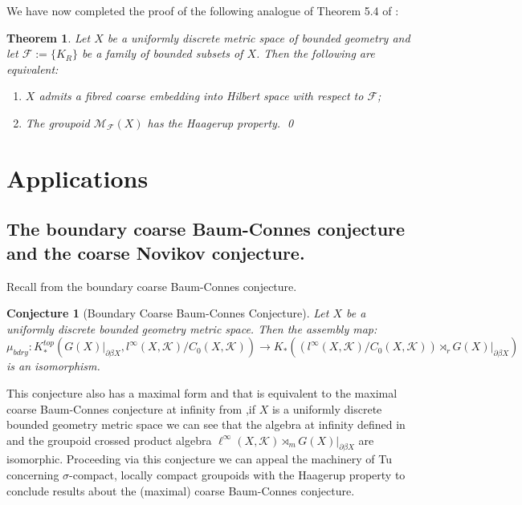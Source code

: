 \documentclass[11pt]{amsart}
\theoremstyle{plain}
\newtheorem{theorem}{Theorem}%
\newtheorem*{conjecture1}{Conjecture}
\theoremstyle{definition}%
\theoremstyle{remark}%
\begin{document}
{We have now completed the proof of the following analogue of Theorem 5.4 of \cite{MR1905840}:

\begin{theorem}
Let $X$ be a uniformly discrete metric space of bounded geometry and let $\mathcal{F}:=\lbrace K_{R} \rbrace$ be a family of bounded subsets of $X$. Then the following are equivalent:
\begin{enumerate}
\item $X$ admits a fibred coarse embedding into Hilbert space with respect to $\mathcal{F}$;
\item The groupoid $\mathcal{M}_{\mathcal{F}}(X)$ has the Haagerup property. \qed
\end{enumerate}
\end{theorem}

\section{Applications}\label{sect:apps}

\subsection{The boundary coarse Baum-Connes conjecture and the coarse Novikov conjecture.}\label{Sect:apps}
Recall from \cite{mypub1} the boundary coarse Baum-Connes conjecture.
\begin{conjecture1} [Boundary Coarse Baum-Connes Conjecture]
Let $X$ be a uniformly discrete bounded geometry metric space. Then the assembly map:
\begin{equation*}
\mu_{bdry}:K_{*}^{top}(G(X)|_{\partial\beta X}, l^{\infty}(X,\mathcal{K})/C_{0}(X,\mathcal{K})) \rightarrow K_{*}((l^{\infty}(X,\mathcal{K})/C_{0}(X,\mathcal{K}))\rtimes_{r}G(X)|_{\partial\beta X})
\end{equation*}
is an isomorphism.
\end{conjecture1}

This conjecture also has a maximal form \cite[Section 2]{mypub1} and that is equivalent to the maximal coarse Baum-Connes conjecture at infinity from \cite{FCEpaper},if $X$ is a uniformly discrete bounded geometry metric space we can see that the algebra at infinity defined in \cite{FCEpaper} and the groupoid crossed product algebra $\ell^{\infty}(X,\mathcal{K})\rtimes_{m}G(X)|_{\partial\beta X}$ are isomorphic. Proceeding via this conjecture we can appeal the machinery of Tu \cite{MR1703305} concerning $\sigma$-compact, locally compact groupoids with the Haagerup property to conclude results about the (maximal) coarse Baum-Connes conjecture. 

}
\end{document}
